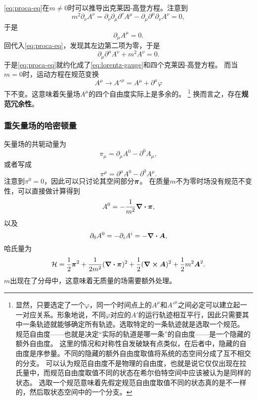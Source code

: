 \documentclass[hyperref, UTF8, a4paper]{ctexart}
\renewcommand{\emph}{\textbf}
\begin{document}
\eqref{eq:proca-eq}在$m \neq 0$时可以推导出克莱因-高登方程。注意到
\[
    m^2 \partial_\nu A^\nu = \partial_\nu \partial_\mu \partial^\nu A^\mu - \partial_\mu \partial^\mu \partial_\nu A^\nu = 0,
\]
于是
\begin{equation}
    \partial_\mu A^\mu = 0.
    \label{eq:lorentz-gauge}
\end{equation}
回代入\eqref{eq:proca-eq}，发现其左边第二项为零，于是
\[
    \partial_\mu \partial^\mu A^\nu + m^2 A^\nu = 0.
\]
于是\eqref{eq:proca-eq}就约化成了\eqref{eq:lorentz-gauge}和四个克莱因-高登方程。
而当$m=0$时，运动方程在规范变换
\begin{equation}
    A^\mu \longrightarrow {A'}^\mu = A^\mu + \partial^\mu \varphi
\end{equation}
下不变。这意味着矢量场$A^\mu$的四个自由度实际上是多余的。%
\footnote{显然，只要选定了一个$\varphi$，同一个时间点上的$A^\mu$和${A'}^\mu$之间必定可以建立起一一对应关系。形象地说，不同$\varphi$对应的$A'$的运行轨迹相互平行，因此只需要其中一条轨迹就能够确定所有轨迹。选取特定的一条轨迹就是选取一个规范。
规范自由度——也就是决定“实际的轨道是哪一条”的自由度——是一个隐藏的额外自由度。
这里的情况和对称性自发破缺有点类似，在后者中，隐藏的自由度是序参量。不同的隐藏的额外自由度取值将系统的态空间分成了互不相交的分支。
可以认为规范自由度不是物理的自由度，也就是说它仅仅出现在拉氏量中，而规范自由度取值不同的状态在希尔伯特空间中应该被认为是同样的状态。
选取一个规范意味着先假定规范自由度取值不同的状态真的是不一样的，然后取状态空间中的一个分支。}%
换而言之，存在\emph{规范冗余性}。

\subsubsection{重矢量场的哈密顿量}

矢量场的共轭动量为
\[
    \pi_\mu = \partial_\mu A^0 - \partial^0 A_\mu,
\]
或者写成
\begin{equation}
    \pi^\mu = \partial^\mu A^0 - \partial^0 A^\mu.
\end{equation}
注意到$\pi^0 = 0$，因此可以只讨论其空间部分$\vb*{\pi}$。
在质量$m$不为零时场没有规范不变性，可以直接做计算得到
\begin{equation}
    A^0 = - \frac{1}{m^2} \div{\vb*{\pi}},
\end{equation}
以及
\begin{equation}
    \partial_0 A^0 = - \partial_i A^i = - \div{\vb*{A}},
\end{equation}
哈氏量为
\begin{equation}
    \mathcal{H} = \frac{1}{2} \vb*{\pi}^2 + \frac{1}{2m^2} (\div{\vb*{\pi}})^2 + \frac{1}{2} (\curl{\vb*{A}})^2 + \frac{1}{2} m^2 \vb*{A}^2.
\end{equation}
$m$出现在了分母中，这意味着无质量的场需要额外处理。
\end{document}
